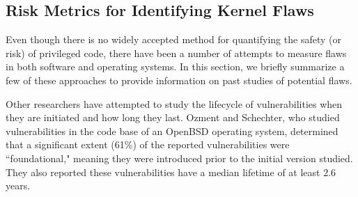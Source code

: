 








\subsection{Risk Metrics for Identifying Kernel Flaws}

Even though there is no widely accepted method for
quantifying the safety (or risk) of privileged code, there have been a number of
attempts to measure flaws in both software and operating systems. In this section,
we briefly summarize a few of these approaches to provide information on
past studies of potential flaws.



Other researchers have attempted to study the lifecycle of vulnerabilities when they are
initiated and how long they last. Ozment and Schechter, who studied vulnerabilities in the code base of an OpenBSD operating system, 
determined that a significant extent (61\%) of the reported
vulnerabilities were ``foundational," meaning they were introduced prior to the
initial version studied. They also reported these vulnerabilities
have a median lifetime of at least 2.6 years.

